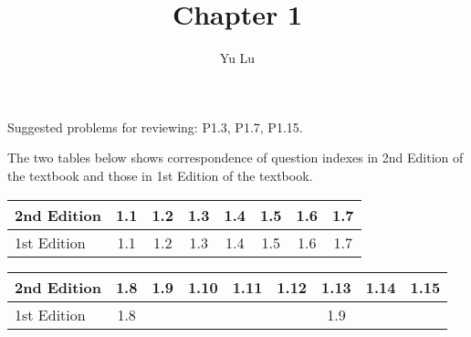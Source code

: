 \documentclass{article}
\title{Chapter 1}
\author{Yu Lu}
\begin{document}
\newcommand{\pz}{\ket{\vb{+z}}}
\newcommand{\nz}{\ket{\vb{-z}}}
\newcommand{\px}{\ket{\vb{+x}}}
\newcommand{\nx}{\ket{\vb{-x}}}
\newcommand{\py}{\ket{\vb{+z}}}
\newcommand{\ny}{\ket{\vb{-y}}}

\newcommand{\pxexpr}{ \frac{1}{\sqrt{2}} \pz + \frac{1}{\sqrt{2}} \nz}
\newcommand{\nxexpr}{ \frac{1}{\sqrt{2}} \pz - \frac{1}{\sqrt{2}} \nz}
\newcommand{\pyexpr}{ \frac{1}{\sqrt{2}} \pz + \frac{i}{\sqrt{2}} \nz}
\newcommand{\nyexpr}{ \frac{1}{\sqrt{2}} \pz - \frac{i}{\sqrt{2}} \nz}
\maketitle
Suggested problems for reviewing: P1.3, P1.7, P1.15.

The two tables below shows correspondence of question indexes in 2nd Edition of the textbook and those in 1st Edition of the textbook.
\begin{table}[h!]
    \begin{center}
        \begin{tabular}{l|c|c|c|c|c|c|c}
            \hline
            2nd Edition
            &1.1
            &1.2
            &1.3
            &1.4
            &1.5
            &1.6
            &1.7
            \\ \hline
            1st Edition
            &1.1
            &1.2
            &1.3
            &1.4
            &1.5
            &1.6
            &1.7
            \\ \hline
        \end{tabular}
    \end{center}
\end{table}
\begin{table}[h!]
    \begin{center}
        \begin{tabular}{l|c|c|c|c|c|c|c|c}
            \hline
            2nd Edition
            &1.8
            &1.9
            &1.10
            &1.11
            &1.12
            &1.13
            &1.14
            &1.15
            \\ \hline
            1st Edition
            &1.8
            &
            &
            &
            &
            &1.9
            &
            &
            \\ \hline
        \end{tabular}
    \end{center}
\end{table}
\end{document}
